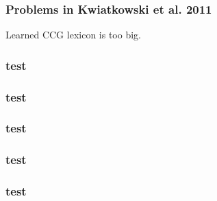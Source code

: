 \documentclass{beamer}
\begin{document}
\begin{frame}
    \frametitle{Problems in Kwiatkowski et al. 2011}

    Learned CCG lexicon is too big.
\end{frame}

\begin{frame}
    \frametitle{test}
\end{frame}

\begin{frame}
    \frametitle{test}
\end{frame}

\begin{frame}
    \frametitle{test}
\end{frame}

\begin{frame}
    \frametitle{test}
\end{frame}

\begin{frame}
    \frametitle{test}
\end{frame}
\end{document}
